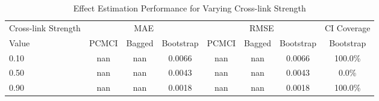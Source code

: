 \begin{table}[htbp]
\centering
\caption{Effect Estimation Performance for Varying Cross-link Strength}
\label{tab:cross_performance}
\begin{tabular}{l|ccc|ccc|c}
\hline
Cross-link Strength & \multicolumn{3}{c|}{MAE} & \multicolumn{3}{c|}{RMSE} & CI Coverage \\
 Value & PCMCI & Bagged & Bootstrap & PCMCI & Bagged & Bootstrap & Bootstrap \\
\hline
0.10 & nan & nan & 0.0066 & nan & nan & 0.0066 & 100.0\% \\
0.50 & nan & nan & 0.0043 & nan & nan & 0.0043 & 0.0\% \\
0.90 & nan & nan & 0.0018 & nan & nan & 0.0018 & 100.0\% \\
\hline
\end{tabular}
\end{table}
